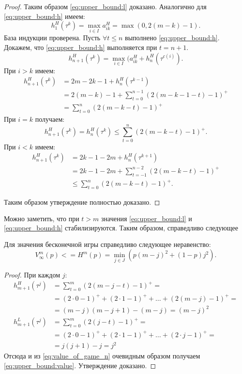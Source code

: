 \begin{proof}
Таким образом \eqref{eq:upper_bound:l} доказано.
Аналогично для \eqref{eq:upper_bound:h} имеем:
\[
  h_1^H(\tau^k) = \max_{i \in I} a_{ik}^H = \max(0, 2(m - k) - 1).
\]
База индукции проверена.
Пусть $ \forall t \leq n $ выполнено \eqref{eq:upper_bound:h}. Докажем, что \eqref{eq:upper_bound:h} выполняется при $ t = n + 1 $.
\[
h_{n+1}^H(\tau^k) = \max_{i \in I}(a_{ik}^H + h_n^H(\tau^{c(i)}).
\]
При $ i > k $ имеем:
\begin{align*}
  h_{n+1}^H(\tau^k) 
  &= 2m - 2k - 1 + h_n^H(\tau^{k-1}) \\
  &= 2(m-k)- 1 + \sum_{t = 0}^{n-1}(2(m-k-1-t)-1)^+ \\
  &= \sum_{t = 0}^n (2(m-k-t) - 1)^+
\end{align*}
При $ i = k $ получаем:
\[
  h_{n+1}^H(\tau^k) = h_n^H(\tau^k) \leq \sum_{t=0}^n(2(m-k-t)-1)^+.
\]
При $ i < k $ имеем:
\begin{align*}
  h_{n+1}^H(\tau^k) 
    &= 2k - 1 - 2m + h_n^H(\tau^{k+1}) \\
    &= 2k - 1 - 2m + \sum_{t = -1}^{n-2} (2(m-k-t)-1)^+ \\
    &\leq \sum_{t=0}^n(2(m-k-t)-1)^+.
\end{align*}

Таким образом утверждение полностью доказано.
\end{proof}

Можно заметить, что при $ t > m $ значения \eqref{eq:upper_bound:l} и \eqref{eq:upper_bound:h} стабилизируются. Таким образом, справедливо следующее

\begin{utver}
Для значения бесконечной игры справедливо следующее неравенство:
\begin{equation}
\label{eq:upper_bound:value}
V_\infty^m(p) 
<= 
H^m(p) = \min_{j \in J}
    (p(m-j)^2 + (1-p)j^2).
\end{equation}
\end{utver}
\begin{proof}
При каждом $ j $:
\begin{align*}
h_{m+1}^H(\tau^j) 
&= \sum_{t=0}^m (2(m-j-t)-1)^+ = \\
&= (2 \cdot 0 - 1)^+ + (2 \cdot 1 - 1)^+ + \ldots + (2(m-j) - 1)^+ = \\
&= (m-j)(m-j+1) - (m-j) = (m-j)^2
\\
h_{m+1}^L(\tau^j)
&= \sum_{t=0}^m (2(j-t)-1)^+ = \\
&= (2 \cdot 0 - 1)^+ + (2 \cdot 1 - 1)^+ + \ldots + (2 \cdot j - 1)^+ = \\
&= j(j+1) - j = j^2
\end{align*}
Отсюда и из \eqref{eq:value_of_game_n} очевидным образом получаем \eqref{eq:upper_bound:value}. Утверждение доказано.
\end{proof}


